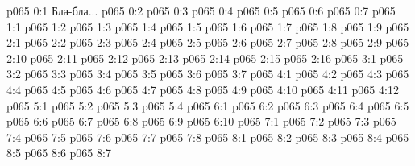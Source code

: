 \author{Носитель Жизни}
\vs p065 0:1  Бла-бла...
\vs p065 0:2 \pc 
\vs p065 0:3 
\vs p065 0:4 
\vs p065 0:5 
\vs p065 0:6 \pc 
\vs p065 0:7 
\vs p065 1:1 
\vs p065 1:2 
\vs p065 1:3 
\vs p065 1:4 
\vs p065 1:5 
\vs p065 1:6 \pc 
\vs p065 1:7 
\vs p065 1:8 
\vs p065 1:9 
\vs p065 2:1 
\vs p065 2:2 
\vs p065 2:3 
\vs p065 2:4 
\vs p065 2:5 
\vs p065 2:6 \pc 
\vs p065 2:7 
\vs p065 2:8 \pc 
\vs p065 2:9 
\vs p065 2:10 
\vs p065 2:11 \pc 
\vs p065 2:12 \pc 
\vs p065 2:13 
\vs p065 2:14 
\vs p065 2:15 
\vs p065 2:16 
\vs p065 3:1 
\vs p065 3:2 \pc 
\vs p065 3:3 
\vs p065 3:4 \pc 
\vs p065 3:5 
\vs p065 3:6 \pc 
\vs p065 3:7 
\vs p065 4:1 
\vs p065 4:2 
\vs p065 4:3 \pc 
\vs p065 4:4 
\vs p065 4:5 
\vs p065 4:6 
\vs p065 4:7 \pc 
\vs p065 4:8 
\vs p065 4:9 
\vs p065 4:10 \pc 
\vs p065 4:11 
\vs p065 4:12 
\vs p065 5:1 
\vs p065 5:2 
\vs p065 5:3 
\vs p065 5:4 
\vs p065 6:1 
\vs p065 6:2 \pc 
\vs p065 6:3 
\vs p065 6:4 
\vs p065 6:5 
\vs p065 6:6 
\vs p065 6:7 \pc 
\vs p065 6:8 
\vs p065 6:9 
\vs p065 6:10 
\vs p065 7:1 
\vs p065 7:2 
\vs p065 7:3 
\vs p065 7:4 
\vs p065 7:5 
\vs p065 7:6 
\vs p065 7:7 
\vs p065 7:8 
\vs p065 8:1 
\vs p065 8:2 
\vs p065 8:3 
\vs p065 8:4 
\vs p065 8:5 \pc 
\vs p065 8:6 
\vsetoff
\vs p065 8:7 
\quizlink
